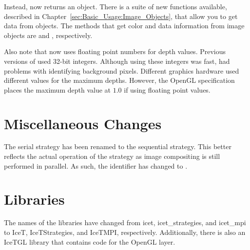 Instead,  now returns an  object.
There is a suite of new functions available, described in
Chapter~\ref{sec:Basic_Usage:Image_Objects}, that allow you to get data
from  objects.  The methods that get color and data
information from image objects are  and
, respectively.

Also note that \IceT now uses floating point numbers for depth values.
Previous versions of \IceT used 32-bit integers.  Although using these
integers was fast, \IceT had problems with identifying background pixels.
Different graphics hardware used different values for the maximum depths.
However, the OpenGL specification places the maximum depth value at $1.0$
if using floating point values.

\section{Miscellaneous Changes}
\label{sec:Transitioning:Miscellaneous}

The serial strategy has been renamed to the sequential strategy.  This
better reflects the actual operation of the strategy as image compositing
is still performed in parallel.  As such, the
 identifier has changed to
.

\section{Libraries}
\label{sec:Transitioning:Libraries}

The names of the libraries have changed from icet,
icet\_strategies, and
icet\_mpi to IceT,
IceTStrategies, and
IceTMPI, respectively.  Additionally, there is
also an IceTGL library that contains code for
the OpenGL layer.
